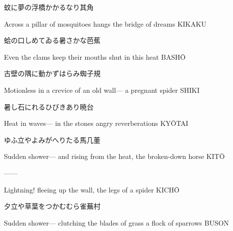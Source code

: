 \begin{haiku}
    {\FH 蚊に夢の浮橋かかるなり}\hfill{\FH 其角}

    \vin{} Across a pillar of mosquitoes
    \vin{} \vin{} hangs the bridge
    \vin{} \vin{} \vin{} of dreams \hspace{\fill} KIKAKU
\end{haiku}

\begin{haiku}
    {\FH 蛤の口しめてゐる暑さかな}\hfill{\FH 芭蕉}

    \vin{} Even the clams
    \vin{} \vin{} keep their mouths shut
    \vin{} \vin{} \vin{} in this heat \hspace{\fill} BASH\={O}
\end{haiku}

\begin{haiku}
    {\FH 古壁の隅に動かずはらみ蜘}\hfill{\FH 子規}

    \vin{} Motionless
    \vin{} \vin{} in a crevice of an old wall---
    \vin{} \vin{} \vin{} a pregnant spider \hspace{\fill} SHIKI
\end{haiku}

\begin{haiku}
    {\FH {}暑し石にれるひびきあり}\hfill{\FH 暁台}

    \vin{} Heat in waves---
    \vin{} \vin{} in the stones
    \vin{} \vin{} \vin{} angry reverberations \hspace{\fill} KY\={O}TAI
\end{haiku}

\begin{haiku}
    {\FH ゆふ立やよみがへりたる馬}\hfill{\FH 几董}

    \vin{} Sudden shower---
    \vin{} \vin{} and rising from the heat,
    \vin{} \vin{} \vin{} the broken-down horse \hspace{\fill} KIT\={O}
\end{haiku}

\begin{haiku}
   ---\hfill{---}

    \vin{} Lightning!
    \vin{} \vin{} fleeing up the wall,
    \vin{} \vin{} \vin{} the legs of a spider \hspace{\fill} KICH\={O}
\end{haiku}

\begin{haiku}
    {\FH 夕立や草葉をつかむむら雀}\hfill{\FH 蕪村}

    \vin{} Sudden shower---
    \vin{} \vin{} clutching the blades of grass
    \vin{} \vin{} \vin{} a flock of sparrows \hspace{\fill} BUSON
\end{haiku}

